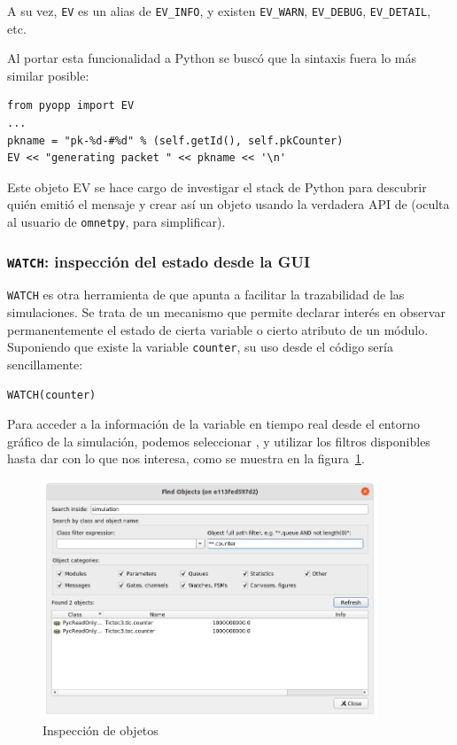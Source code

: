 \documentclass[]{article}
\begin{document}

A su vez, \verb!EV! es un alias de \verb!EV_INFO!, y existen \verb!EV_WARN!,
\verb!EV_DEBUG!, \verb!EV_DETAIL!, etc.

Al portar esta funcionalidad a Python se buscó que la sintaxis fuera lo más
similar posible:

\begin{verbatim}
from pyopp import EV
...
pkname = "pk-%d-#%d" % (self.getId(), self.pkCounter)
EV << "generating packet " << pkname << '\n'
\end{verbatim}

Este objeto EV se hace cargo de investigar el stack de Python para descubrir
quién emitió el mensaje y crear así un objeto usando la verdadera API de
\omnetpp{} (oculta al usuario de \verb!omnetpy!, para simplificar).

\subsubsection{\texttt{WATCH}: inspección del estado desde la GUI}

\verb!WATCH! es otra herramienta de \omnetpp{} que apunta a facilitar la
trazabilidad de las simulaciones. Se trata de un mecanismo que permite declarar
interés en observar permanentemente el estado de cierta variable o cierto
atributo de un módulo. Suponiendo que existe la variable \verb!counter!, su uso
desde el código sería sencillamente:

\begin{verbatim}
WATCH(counter)
\end{verbatim}

Para acceder a la información de la variable en tiempo real desde el entorno
gráfico de la simulación, podemos seleccionar , y utilizar los filtros disponibles hasta dar con lo que nos
interesa, como se muestra en la figura~\ref{fig:tictoc_inspect}.

\begin{figure}[h]
\caption{Inspección de objetos}
\label{fig:tictoc_inspect}
\centering
\includegraphics[width=10cm]{tictoc_inspect}
\end{figure}
\end{document}

